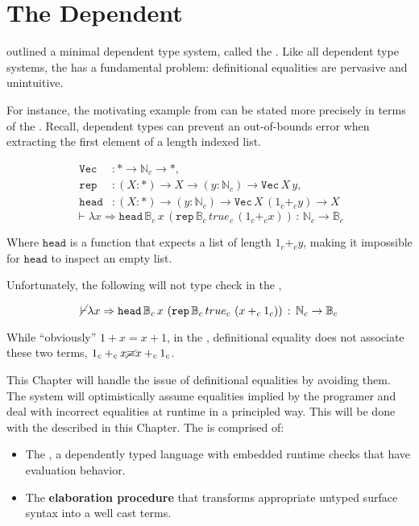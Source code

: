 \chapter{The Dependent \CSys{}}
\label{chapter:Cast}
\thispagestyle{myheadings}
 
 outlined a minimal dependent type system, called the \slang{}.
Like all dependent type systems, the \slang{} has a fundamental problem: definitional equalities are pervasive and unintuitive.
 
For instance, the motivating example from  can be stated more precisely in terms of the \slang{}.
Recall, dependent types can prevent an out-of-bounds error when extracting the first element of a length indexed list.

\begin{align*}
\mathtt{Vec} & :*\rightarrow\mathbb{N}_{c}\rightarrow*,\\
\mathtt{rep} & :\left(X:*\right)\rightarrow X\rightarrow\left(y:\mathbb{N}_{c}\right)\rightarrow\mathtt{Vec\,}X\,y,\\
\mathtt{head} & :\left(X:*\right)\rightarrow\left(y:\mathbb{N}_{c}\right)\rightarrow\mathtt{Vec}\,X\,\left(1_{c}+_{c}y\right)\rightarrow X
\end{align*}
\[
\vdash\lambda x\Rightarrow\mathtt{head}\,\mathbb{B}_{c}\,x\,\left(\mathtt{rep}\,\mathbb{B}_{c}\,true_{c}\,\left(1_{c}+_{c}x\right)\right)\,:\,\mathbb{N}_{c}\rightarrow\mathbb{B}_{c}
\]

Where $\mathtt{head}$ is a function that expects a list of length $1_{c}+_{c}y$, making it impossible for $\mathtt{head}$ to inspect an empty list.

Unfortunately, the following will not type check in the \slang{},

\[
\cancel{\vdash}\lambda x\Rightarrow\mathtt{head}\,\mathbb{B}_{c}\,x\,\left(\mathtt{rep}\,\mathbb{B}_{c}\,true_{c}\,\left(x+_{c}1_{c}\right)\right)\,:\,\mathbb{N}_{c}\rightarrow\mathbb{B}_{c}
\]

While ``obviously'' $1+x=x+1$, in the \slang{}, definitional equality does not associate these two terms, $1_{c}+_{c}x\cancel{\equiv}x+_{c}1_{c}$.
 
This Chapter will handle the issue of definitional equalities by avoiding them.
The system will optimistically assume equalities implied by the programer and deal with incorrect equalities at runtime in a principled way.
This will be done with the \textbf{\csys{}} described in this Chapter.
The \csys{} is comprised of:
\begin{itemize}
\item The \textbf{\clang{}}, a dependently typed language with embedded runtime checks that have evaluation behavior.
\item The \textbf{elaboration procedure} that transforms appropriate untyped surface syntax into a well cast terms.
\end{itemize}
 
